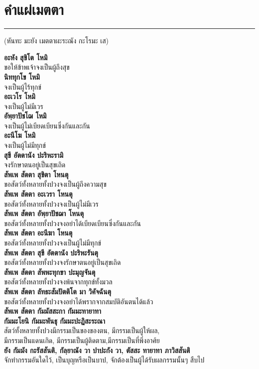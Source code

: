 \documentclass[12pt]{article}
\begin{document}
\section{คำแผ่เมตตา}
\hrule
\begin{center}(หันทะ มะยัง เมตตาผะระณัง กะโรมะ เส)\end{center}
\textbf{อะหัง สุขิโต โหมิ\\}
\indent ขอให้ข้าพเจ้าจงเป็นผู้ถึงสุข\\
\textbf{นิททุกโข โหมิ\\}
\indent จงเป็นผู้ไร้ทุกข์\\
\textbf{อะเวโร โหมิ\\}
\indent จงเป็นผู้ไม่มีเวร\\
\textbf{อัพฺยาปัชโฌ โหมิ \\}
\indent จงเป็นผู้ไม่เบียดเบียนซึ่งกันและกัน\\
\textbf{อะนีโฆ โหมิ\\}
\indent จงเป็นผู้ไม่มีทุกข์\\
\textbf{สุขี อัตตานัง ปะริหะรามิ\\}
\indent จงรักษาตนอยู่เป็นสุขเถิด\\
\textbf{สัพเพ สัตตา สุขิตา โหนตุ\\}
\indent ขอสัตว์ทั้งหลายทั้งปวงจงเป็นผู้ถึงความสุข\\
\textbf{สัพเพ สัตตา อะเวรา โหนตุ\\}
\indent ขอสัตว์ทั้งหลายทั้งปวงจงเป็นผู้ไม่มีเวร\\
\textbf{สัพเพ สัตตา อัพฺยาปัชฌา โหนตุ\\}
\indent ขอสัตว์ทั้งหลายทั้งปวงจงอย่าได้เบียดเบียนซึ่งกันและกัน\\
\textbf{สัพเพ สัตตา อะนีฆา โหนตุ\\}
\indent ขอสัตว์ทั้งหลายทั้งปวงจงเป็นผู้ไม่มีทุกข์\\
\textbf{สัพเพ สัตตา สุขี อัตตานัง ปะริหะรันตุ\\}
\indent ขอสัตว์ทั้งหลายทั้งปวงจงรักษาตนอยู่เป็นสุขเถิด\\
\textbf{สัพเพ สัตตา สัพพะทุกขา ปะมุญจันตุ\\}
\indent ขอสัตว์ทั้งหลายทั้งปวงจงพ้นจากทุกข์ทั้งมวล\\
\textbf{สัพเพ สัตตา ลัทธะสัมปัตติโต มา วิคัจฉันตุ\\}
\indent ขอสัตว์ทั้งหลายทั้งปวงจงอย่าได้พรากจากสมบัติอันตนได้แล้ว\\
\textbf{สัพเพ สัตตา กัมมัสสะกา กัมมะทายาทา\\
กัมมะโยนิ กัมมะพันธุ กัมมะปะฏิสะระณา\\}
\indent สัตว์ทั้งหลายทั้งปวงมีกรรมเป็นของของตน, มีกรรมเป็นผู้ให้ผล,\\
\indent มีกรรมเป็นแดนเกิด, มีกรรมเป็นผู้ติดตาม,มีกรรมเป็นที่พึ่งอาศ้ย\\
\textbf{ยัง กัมมัง กะรัสสันติ, กัลฺยาณัง วา ปาปะกัง วา, ตัสสะ ทายาทา ภาวิสสันติ\\}
\indent จักทำกรรมอันใดไว้, เป็นบุญหรือเป็นบาป, จักต้องเป็นผู้ได้รับผลกรรมนั้นๆ สืบไป
\end{document}
